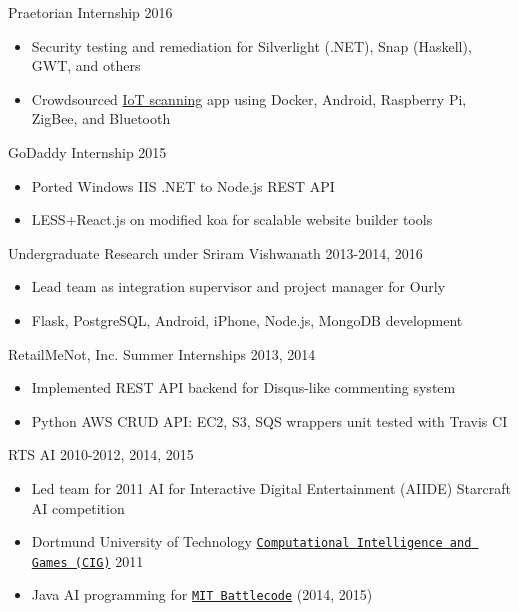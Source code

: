 \documentclass[line,margin]{res}
\begin{document}
\begin{resume}
    \vspace{-8pt}
    Praetorian Internship
    \hfill  2016
        \begin{itemize} \itemsep -2pt
        \item Security testing and remediation for Silverlight (.NET), Snap (Haskell), GWT, and others
        \item Crowdsourced \href{https://iotmap.io}{IoT scanning} app using 
            Docker, Android, Raspberry Pi, ZigBee, and Bluetooth
        \end{itemize}

    \vspace{-8pt}
    GoDaddy Internship
    \hfill  2015
        \begin{itemize} \itemsep -2pt
        \item Ported Windows IIS .NET to Node.js REST API
        \item LESS+React.js on modified koa for scalable website builder tools
        \end{itemize}

    \vspace{-8pt}
    Undergraduate Research under Sriram Vishwanath
    \hfill  2013-2014, 2016
        \begin{itemize} \itemsep -2pt
        \item Lead team as integration supervisor and project manager for Ourly
        \item Flask, PostgreSQL, Android, iPhone, Node.js, MongoDB development
        \end{itemize}

    \vspace{-8pt}
    RetailMeNot, Inc. Summer Internships
    \hfill  2013, 2014
        \begin{itemize} \itemsep -2pt
        \item Implemented REST API backend for Disqus-like commenting system
        \item Python AWS CRUD API: EC2, S3, SQS wrappers unit tested with Travis CI
        \end{itemize}

    \vspace{-8pt}
    RTS AI
    \hfill  2010-2012, 2014, 2015
        \begin{itemize} \itemsep -2pt
        \item Led team for 2011 AI for Interactive Digital Entertainment (AIIDE) Starcraft AI competition  
        \item Dortmund University of Technology \href{https://www.s11-www.cs.uni-dortmund.de/rts-competition/starcraft-cig2011}{\texttt{Computational Intelligence and Games (CIG)}} 2011
        \item Java AI programming for \href{http://www.battlecode.org/}{\texttt{MIT Battlecode}} (2014, 2015)
        \end{itemize}



\end{resume}
\end{document}
